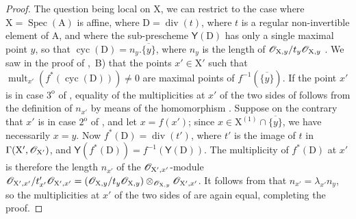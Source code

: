 \begin{proof}
The question being local on $\mathrm{X}$, we can restrict to the case where $\mathrm{X}=\operatorname{Spec}(\mathrm{A})$ is affine, where $\mathrm{D}=\operatorname{div}(t)$, where $t$ is a regular non-invertible element of $\mathrm{A}$, and where the sub-prescheme $\boldsymbol{\mathsf{Y}}(\mathrm{D})$  has only a single maximal point $y$, so that $\operatorname{cyc}(\mathrm{D})=n_y.\overline{\{y\}}$, where $n_y$ is the length of $\mathscr{O}_{\mathrm{X},y}/t_y\mathscr{O}_{\mathrm{X},y}$ .
We saw in the proof of ,~B) that the points $x'\in\mathrm{X}'$ such that $\operatorname{mult}_{x'}(f^*(\operatorname{cyc}(\mathrm{D})))\neq 0$ are maximal points of $f^{-1}(\overline{\{y\}})$.
If the point $x'$ is in case $3^{\mathrm{o}}$ of , equality of the multiplicities at $x'$ of the two sides of  follows from the definition of $n_{x'}$ by means of the homomorphism .
Suppose on the contrary that $x'$ is in case $2^{\mathrm{o}}$ of , and let $x=f(x')$; since $x\in\mathrm{X}^{(1)}\cap\overline{\{y\}}$, we have necessarily $x=y$.
Now $f^*(\mathrm{D})=\operatorname{div}(t')$, where $t'$ is the image of $t$ in $\Gamma(\mathrm{X}',\mathscr{O}_{\mathrm{X}'})$, and $\boldsymbol{\mathsf{Y}}(f^*(\mathrm{D}))=f^{-1}(\boldsymbol{\mathsf{Y}}(\mathrm{D}))$.
The multiplicity of $f^*(\mathrm{D})$ at $x'$ is therefore the length $n_{x'}$ of the $\mathscr{O}_{\mathrm{X}',x'}$-module
$\mathscr{O}_{\mathrm{X}',x'}/t'_{x'}\mathscr{O}_{\mathrm{X}',x'}=(\mathscr{O}_{\mathrm{X},y}/t_y\mathscr{O}_{\mathrm{X},y})\otimes_{\mathscr{O}_{\mathrm{X},y}}\mathscr{O}_{\mathrm{X}',x'}$.
It follows from  that $n_{x'}=\lambda_{x'}n_y$, so the multiplicities at $x'$ of the two sides of  are again equal, completing the proof.
\end{proof}

